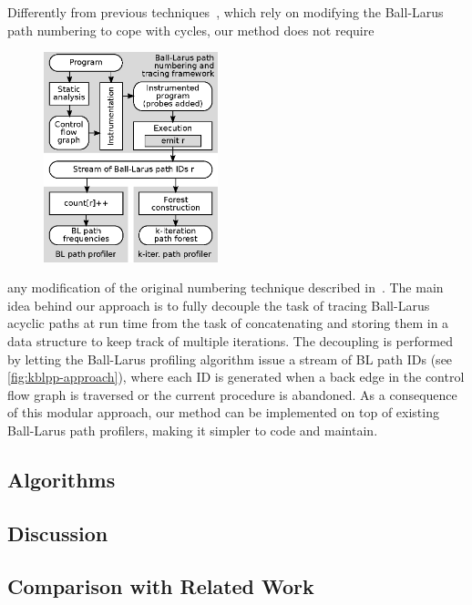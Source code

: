Differently from previous techniques~\cite{Tallam04,Roy09,Li12}, which rely on modifying the Ball-Larus path numbering to cope with cycles, our method does not	require
\ifdefined\noauthorea
\begin{figure}
\vspace{-2mm}
\centering
\includegraphics[width=0.45\textwidth]{figures/kblpp-approach/kblpp-approach.eps}
\caption{\protect}
\end{figure}
\noindent
\fi
any modification of the original numbering technique described in~\cite{Ball96}. The main idea behind our approach is to fully decouple the task of tracing Ball-Larus acyclic paths at run time from the task of concatenating and storing them in a data structure to keep track of multiple iterations. The decoupling is performed by letting the Ball-Larus profiling algorithm issue a stream of BL path IDs (see \myfigure\ref{fig:kblpp-approach}), where each ID is generated when a back edge in the control flow graph is traversed or the current procedure is abandoned. As a consequence of this modular approach, our method can be implemented on top of existing Ball-Larus path profilers, making it simpler to code and maintain.


\subsection{Algorithms}

\subsection{Discussion}

\subsection{Comparison with Related Work}